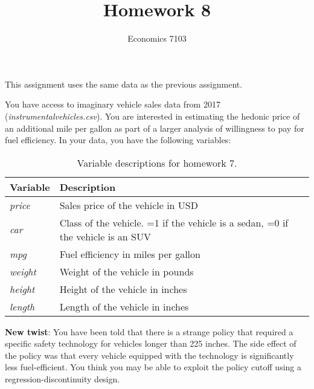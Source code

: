 \documentclass{article}
\title{Homework 8}
\author{Economics 7103}
\begin{document}
\maketitle

\noindent This assignment uses the same data as the previous assignment.

\noindent You have access to imaginary vehicle sales data from 2017 (\textit{instrumentalvehicles.csv}).  You are interested in estimating the hedonic price of an additional mile per gallon as part of a larger analysis of willingness to pay for fuel efficiency.  In your data, you have the following variables:
\begin{table}[h]
    \centering
    \begin{tabular}{l|l}
        Variable & Description \\ \hline
         \textit{price} & Sales price of the vehicle in USD  \\
         \textit{car} & Class of the vehicle. =1 if the vehicle is a sedan, =0 if the vehicle is an SUV \\
         \textit{mpg} & Fuel efficiency in miles per gallon \\
         \textit{weight} & Weight of the vehicle in pounds \\
         \textit{height} & Height of the vehicle in inches \\
         \textit{length} & Length of the vehicle in inches \\
    \end{tabular}
    \caption{Variable descriptions for homework 7.}
    \label{tab:variables7}
\end{table}

\textbf{New twist}: You have been told that there is a strange policy that required a specific safety technology for vehicles longer than 225 inches.  The side effect of the policy was that every vehicle equipped with the technology is significantly less fuel-efficient.  You think you may be able to exploit the policy cutoff using a regression-discontinuity design.
\end{document}
